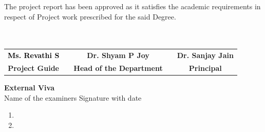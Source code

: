 \documentclass[11pt,a4paper]{article}
\begin{document}
 The project report has been approved as it satisfies the academic requirements in respect of Project work prescribed for the said Degree.\\
\\
\\
\begin{center}
\begin{tabular}{c c c c c}
\textbf{\textcolor{black}{Ms. Revathi S}} & \hspace{1cm} & \textbf{Dr. Shyam P Joy} & \hspace{1cm} & \textbf{Dr. Sanjay Jain} \\
\textbf{Project Guide} & & \textbf{Head of the Department} & & \textbf{Principal} \\
\end{tabular}
\end{center}
\vspace{0.5in}


\textbf{External Viva} \\[0.2in]

Name of the examiners Signature with date

\begin{enumerate}
    \item 
    \item 
\end{enumerate}
\end{document}
